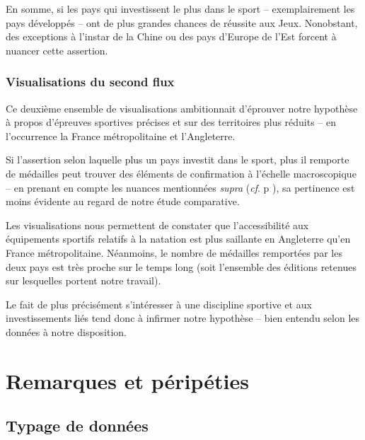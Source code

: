 \documentclass[hidelinks, 12pt]{report}
\begin{document}
En somme, si les pays qui investissent le plus dans le sport -- exemplairement les pays développés -- ont de plus grandes chances de réussite aux Jeux. Nonobstant, des exceptions à l'instar de la Chine ou des pays d'Europe de l'Est forcent à nuancer cette assertion.





%





\subsection{Visualisations du second flux}

Ce deuxième ensemble de visualisations ambitionnait d'éprouver notre hypothèse à propos d'épreuves sportives précises et sur des territoires plus réduits -- en l'occurrence la France métropolitaine et l'Angleterre.

Si l'assertion selon laquelle plus un pays investit dans le sport, plus il remporte de médailles peut trouver des éléments de confirmation à l'échelle macroscopique -- en prenant en compte les nuances mentionnées \textit{supra} (\textit{cf}. p \pageref{nuance}), sa pertinence est moins évidente au regard de notre étude comparative.

Les visualisations nous permettent de constater que l'accessibilité aux équipements sportifs relatifs à la natation est plus saillante en Angleterre qu'en France métropolitaine. Néanmoins, le nombre de médailles remportées par les deux pays est très proche sur le temps long (soit l'ensemble des éditions retenues sur lesquelles portent notre travail).

Le fait de plus précisément s'intéresser à une discipline sportive et aux investissements liés tend donc à infirmer notre hypothèse -- bien entendu selon les données à notre disposition.





%





\chapter{Remarques et péripéties}

\section{Typage de données}
\end{document}
